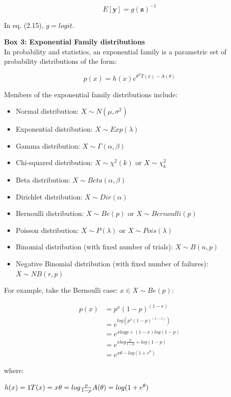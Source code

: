 \begin{equation*}
 E[\mathbf{y}] = g(\mathbf{z})^{-1} 
\end{equation*}

In eq. (2.15), $ g = logit $.



\newpage

\begin{Comment}
\hspace{-2.5mm}\textbf{Box 3: Exponential Family distributions}\label{box3}\\
In probability and statistics, an exponential family is a parametric set of probability distributions of the form:

\begin{equation*}
    p(x) = h(x)e^{\theta^TT(x)-A(\theta)}
\end{equation*}

Members of the exponential family distributions include:
\begin{itemize}
    \item Normal distribution: $X \sim N(\mu,\sigma^2)$
    \item Exponential distribution: $ X \sim Exp(\lambda)$
    \item Gamma distribution: $ X \sim \Gamma(\alpha,\beta)$
    \item Chi-squared distribution: $ X \sim \chi^2 (k)$ or $ X \sim \chi_k^2$
    \item Beta distribution: $ X \sim Beta(\alpha,\beta)$
    \item Dirichlet distribution: $ X \sim Dir(\alpha)$
    \item Bernoulli distribution: $ X \sim Be(p)$ or $ X \sim Bernoulli(p)$
    \item Poisson distribution: $ X \sim P(\lambda)$ or $ X \sim Pois(\lambda)$
    \item Binomial distribution (with fixed number of trials): $ X \sim B(n,p)$
    \item Negative Binomial distribution (with fixed number of failures): $ X \sim NB(r,p)$\\
\end{itemize}

For example, take the Bernoulli case: $x \in X \sim Be(p)$:

\begin{equation*}
\begin{split}
    p(x) & = p^x(1-p)^{(1-x)}\\
         & = e^{log(p^x(1-p)^{(1-x)})}\\
         & = e^{xlogp + (1-x)log(1-p)}\\
         & = e^{xlog\frac{p}{1-p}+log(1-p)}\\
         & = e^{x\theta - log(1+e^\theta)}
\end{split}
\end{equation*}

where: 

\hfill $h(x)=1 \hfill T(x)=x \hfill \theta = log \frac{p}{1-p} \hfill A(\theta) = log(1+e^\theta)$ \hfill

\end{Comment}

